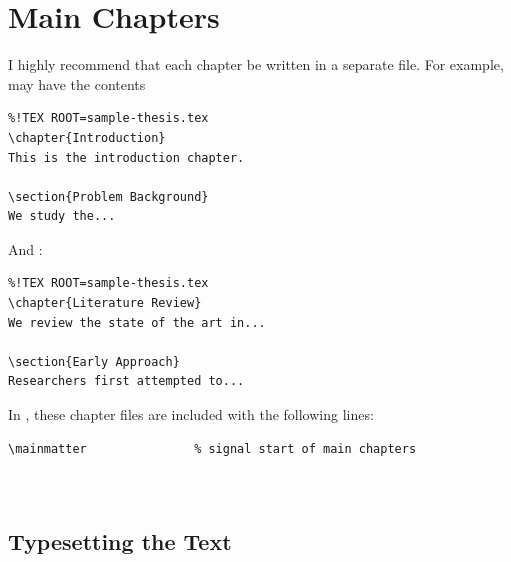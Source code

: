 \documentclass[a4paper,nofonts,raggedright,titlepage,openany]{tufte-book}
\begin{document}
\section{Main Chapters}

I highly recommend that each chapter be written in a separate file. For example,  may have the contents

\begin{verbatim}
%!TEX ROOT=sample-thesis.tex
\chapter{Introduction}
This is the introduction chapter.

\section{Problem Background}
We study the...
\end{verbatim}



And :
\begin{verbatim}
%!TEX ROOT=sample-thesis.tex
\chapter{Literature Review}
We review the state of the art in...

\section{Early Approach}
Researchers first attempted to...
\end{verbatim}


In , these chapter files are included with the following lines:

\begin{verbatim}
\mainmatter               % signal start of main chapters



\end{verbatim}

\subsection{Typesetting the Text}
\end{document}
